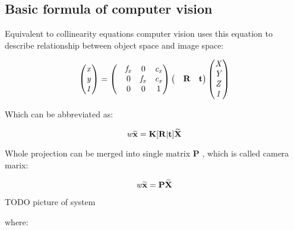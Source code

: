 \documentclass[a4paper,12pt]{report}
\newcommand{\ematr}[1]{
{\bf #1}
}
\newcommand{\evect}[1]{
{\bf #1}
}
\newcommand{\ehvect}[1]{
{\bf \widetilde{#1}}
}
\newcommand{\escal}[1]{
{\it #1}
}
\begin{document}
\subsection{Basic formula of computer vision}

Equivalent to collinearity equations computer vision uses this equation to describe relationship between
object space and image space:

\begin{equation}
\begin{pmatrix}
   \escal{x} \\
   \escal{y} \\
   \escal{1} \\
\end{pmatrix}
=
\begin{pmatrix}
   & \escal{f_{x}} & 0     & \escal{c_{x}}\\
   & 0     & \escal{f_{x}} & \escal{c_{x}}\\
   & 0     & 0     & 1\\
\end{pmatrix}
\begin{pmatrix}
   &\ematr{R} & \evect{t}\\
\end{pmatrix}
\begin{pmatrix}
   \escal{X} \\
   \escal{Y} \\
   \escal{Z} \\
   \escal{1} \\
\end{pmatrix}
\end{equation}

Which can be abbreviated as:

\begin{equation}
\escal{w} \ehvect{x} = \ematr{K} \ematr{[}\ematr{R}|\evect{t}\ematr{]} \ehvect{X}
\label{eq:p_exp}
\end{equation}

Whole projection can be merged into single matrix \ematr{P}, which is called camera marix:

\begin{equation}
\escal{w} \ehvect{x} = \ematr{P} \ehvect{X}
\label{eq:p_abbr}
\end{equation}

TODO picture of system

where:
\end{document}

